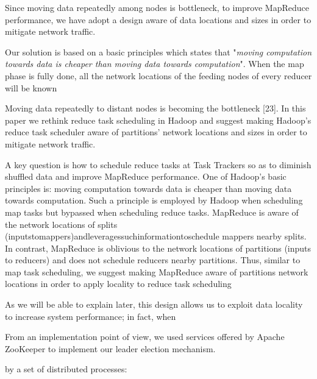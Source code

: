 \documentclass[sigchi]{acmart}
\begin{document}
Since moving data repeatedly among nodes is bottleneck, to improve MapReduce performance, we have adopt a design aware of data locations and sizes in order to mitigate network traffic.

Our solution is based on a basic principles which states that "\textit{moving computation towards data is cheaper than moving data towards computation}". When the map phase is fully done, all the network locations of the feeding nodes of every reducer will be known


Moving data repeatedly to distant nodes is becoming the bottleneck [23]. In this paper we rethink reduce task scheduling in Hadoop and suggest making Hadoop’s reduce task scheduler aware of partitions’ network locations and sizes in order to mitigate network traffic. 

A key question is how to schedule reduce tasks at Task Trackers so as to diminish shuffled data and improve MapReduce performance. One of Hadoop’s basic principles is: moving computation towards data is cheaper than moving data towards computation. Such a principle is employed by Hadoop when scheduling map tasks but bypassed when scheduling reduce tasks. MapReduce is aware of the network locations of splits (inputstomappers)andleveragessuchinformationtoschedule mappers nearby splits. In contrast, MapReduce is oblivious to the network locations of partitions (inputs to reducers) and does not schedule reducers nearby partitions. Thus, similar to map task scheduling, we suggest making MapReduce aware of partitions network locations in order to apply locality to reduce task scheduling



As we will be able to explain later, this design allows us to exploit data locality to increase system performance; in fact, when 


From an implementation point of view, we used services offered by Apache ZooKeeper to implement our leader election mechanism.


















 by a set of distributed processes:
\end{document}
